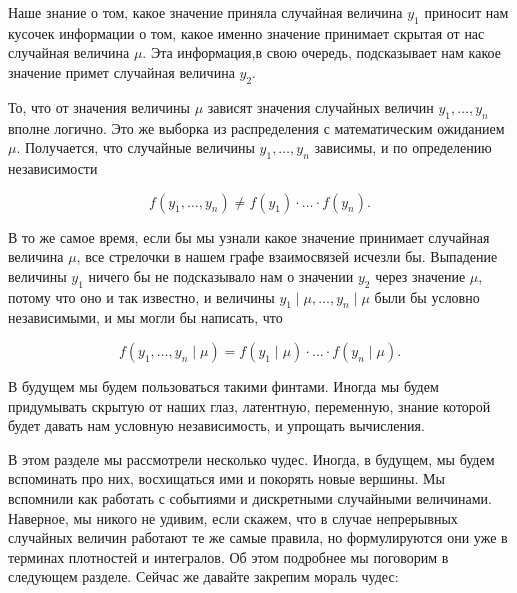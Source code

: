 \begin{center}
\end{center}

Наше знание о том, какое значение приняла случайная величина $y_1$ приносит нам кусочек информации о том, какое именно значение принимает скрытая от нас случайная величина $\mu$. Эта информация,в свою очередь, подсказывает нам какое значение примет случайная величина $y_2$.

То, что от значения величины $\mu$ зависят значения случайных величин $y_1, \ldots, y_n$ вполне логично. Это же выборка из распределения с математическим ожиданием $\mu$. Получается, что случайные величины $y_1, \ldots, y_n$ зависимы, и по определению независимости 

\[f(y_1, \ldots, y_n) \neq f(y_1) \cdot  \ldots \cdot f(y_n).\]

В то же самое время, если бы мы узнали какое значение принимает случайная величина $\mu$, все стрелочки в нашем графе взаимосвязей исчезли бы. Выпадение величины $y_1$ ничего бы не подсказывало нам о значении $y_2$ через значение $\mu$, потому что оно и так известно, и величины $y_1 \mid \mu, \ldots, y_n \mid \mu$ были бы условно независимыми, и мы могли бы написать, что

 \[ f(y_1, \ldots, y_n \mid \mu) = f(y_1 \mid \mu) \cdot \ldots \cdot f(y_n \mid \mu). \] 

В будущем мы будем пользоваться такими финтами. Иногда мы будем придумывать скрытую от наших глаз, латентную, переменную, знание которой будет давать нам условную независимость, и упрощать вычисления.

В этом разделе мы рассмотрели несколько чудес. Иногда, в будущем, мы будем вспоминать про них, восхищаться ими и покорять новые вершины. Мы вспомнили как работать с событиями и дискретными случайными величинами. Наверное, мы никого не удивим, если скажем, что в случае непрерывных случайных величин работают те же самые правила, но формулируются они уже в терминах плотностей и интегралов.  Об этом подробнее мы поговорим в следующем разделе. Сейчас же давайте закрепим мораль чудес: 

